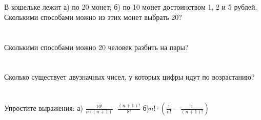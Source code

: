 \documentclass{article}%
\begin{document}
%
\section{}%
\label{sec:}%
В кошельке лежит а) по 20 монет; б) по 10 монет достоинством 1, 2 и 5 рублей.
Сколькими способами можно из этих монет выбрать 20?%
%
\iffalse%
Автор: Дмитрий Трущин%
Дата: 01{-}10{-}2013%
Название: None%
Подсказка: \textbackslash{}\textbackslash{}%
nan%
\fi

%
\section{}%
\label{sec:}%
Сколькими способами можно 20 человек разбить на пары?%
%
\iffalse%
Автор: 25 школа%
Дата: 01{-}07{-}2017%
Название: None%
Подсказка: \textbackslash{}\textbackslash{}%
nan%
\fi

%
\section{}%
\label{sec:}%
Сколько существует двузначных чисел, у которых цифры идут по возрастанию?%
%
\iffalse%
Автор: Ираклий Гагуа%
Дата: 07{-}01{-}2011%
Название: None%
Подсказка: \textbackslash{}\textbackslash{}%
nan%
\fi

%
\section{}%
\label{sec:}%
Упростите выражения: а) $\frac{10 !}{n \cdot(n+1)} \cdot  \frac{(n+1) !}{8 !}$ б)$n ! \cdot\left(\frac{1}{n !}-\frac{1}{(n+1) !}\right)$%
%
\iffalse%
Автор: Дарья Анзон%
Дата: 01{-}07{-}2017%
Название: None%
Подсказка: \textbackslash{}\textbackslash{}%
nan%
\fi

%
\end{document}
